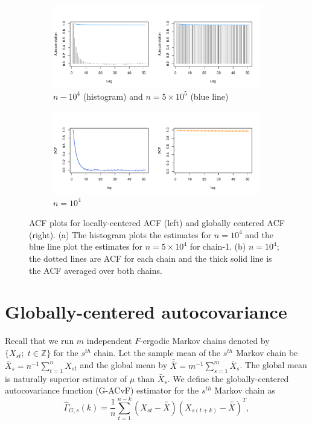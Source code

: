 \documentclass[11pt]{article}
\theoremstyle{remark}
\begin{document}
\begin{figure}[htbp]
\centering
\begin{subfigure}{.9\textwidth}
   \centering
   \includegraphics[width=.9\textwidth]{plots/gaussian-acf_hist.pdf}
   \caption{$n-10^4$ (histogram) and $n = 5 \times 10^5$ (blue line)}
   \label{subfig:gauss-acf_1e4_1e5}
\end{subfigure}
\begin{subfigure}{.9\textwidth}
   \centering
   \includegraphics[width=.9\textwidth]{plots/gaussian-acf_1e4.pdf} 
   \caption{$n = 10^4$}
   \label{subfig:gauss-acf_1e4}
\end{subfigure}
\caption{ACF plots for locally-centered ACF (left) and globally centered ACF (right). (a) The histogram plots the estimates for $n = 10^4$ and the blue line plot the estimates for $n = 5 \times 10^4$ for chain-1. (b) $n = 10^4$; the dotted lines are ACF for each chain and the thick solid line is the ACF averaged over both chains.}
\label{fig:gaussian-acf}
\end{figure}


\section{Globally-centered autocovariance} \label{sec:G-ACF}

Recall that we run $m$ independent $F$-ergodic Markov chains denoted by $\{X_{st}; \; t \in \mathbb{Z}\}$ for the $s^{th}$ chain. Let the sample mean of the $s^{th}$ Markov chain be $\bar{X}_s = n^{-1} \sum_{t=1}^{n} X_{st}$ and the global mean by $\bar{\bar{X}} = m^{-1}\sum_{s = 1}^{m}\bar{X}_s$. The global mean is naturally superior estimator of $\mu$ than $\bar{X}_s$. We define the globally-centered autocovariance function (G-ACvF) estimator for the $s^{th}$ Markov chain as
%
\begin{equation} \label{eq:G-ACvF}
    \hat{\Gamma}_{G,s}(k) = \dfrac{1}{n} \sum_{t=1}^{n-k}(X_{st}-\bar{\bar{X}})(X_{s(t+k)}-\bar{\bar{X}})^T,
\end{equation}
\end{document}
